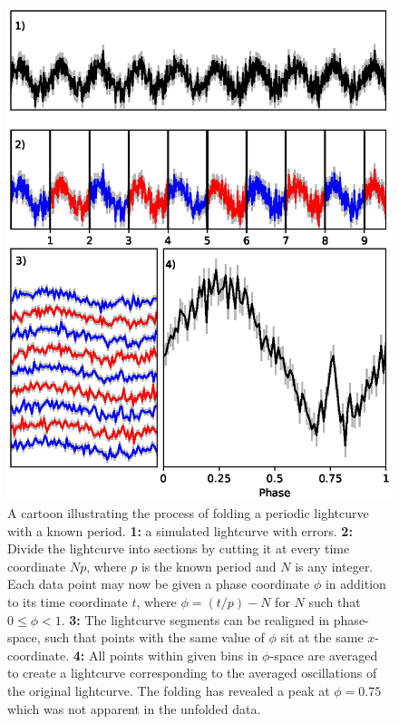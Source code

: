 \begin{figure}
    \includegraphics[width=\columnwidth, trim = 0mm 20mm 0mm 28mm]{images/folding.eps}
    \captionsetup{singlelinecheck=off}
    \caption[A cartoon illustrating the process of folding a periodic lightcurve with a known period.]{A cartoon illustrating the process of folding a periodic lightcurve with a known period.  \textbf{1:} a simulated lightcurve with errors.  \textbf{2:} Divide the lightcurve into sections by cutting it at every time coordinate $Np$, where $p$ is the known period and $N$ is any integer.  Each data point may now be given a phase coordinate $\phi$ in addition to its time coordinate $t$, where $\phi=(t/p)-N$ for $N$ such that $0\leq\phi<1$.  \textbf{3:} The lightcurve segments can be realigned in phase-space, such that points with the same value of $\phi$ sit at the same $x$-coordinate.  \textbf{4:} All points within given bins in $\phi$-space are averaged to create a lightcurve corresponding to the averaged oscillations of the original lightcurve.  The folding has revealed a peak at $\phi=0.75$ which was not apparent in the unfolded data.}
   \label{fig:Folding}
\end{figure}

